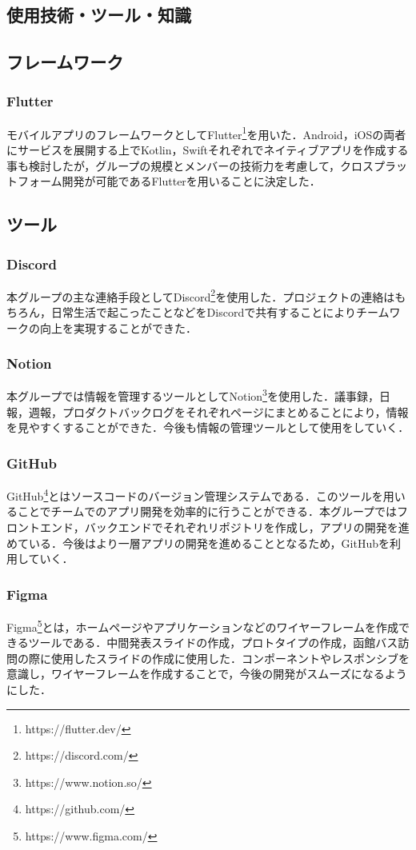 \documentclass[openany,11pt,papersize,dvipdfm]{jsbook}
\begin{document}
\begin{appendix}

\chapter{使用技術・ツール・知識}
\section{フレームワーク}
\subsection{Flutter}
モバイルアプリのフレームワークとしてFlutter\footnote{https://flutter.dev/}を用いた．Android，iOSの両者にサービスを展開する上でKotlin，Swiftそれぞれでネイティブアプリを作成する事も検討したが，グループの規模とメンバーの技術力を考慮して，クロスプラットフォーム開発が可能であるFlutterを用いることに決定した．

\section{ツール}
\subsection{Discord}
本グループの主な連絡手段としてDiscord\footnote{https://discord.com/}を使用した．プロジェクトの連絡はもちろん，日常生活で起こったことなどをDiscordで共有することによりチームワークの向上を実現することができた．

\subsection{Notion}
本グループでは情報を管理するツールとしてNotion\footnote{https://www.notion.so/}を使用した．議事録，日報，週報，プロダクトバックログをそれぞれページにまとめることにより，情報を見やすくすることができた．今後も情報の管理ツールとして使用をしていく．

\subsection{GitHub}
GitHub\footnote{https://github.com/}とはソースコードのバージョン管理システムである．このツールを用いることでチームでのアプリ開発を効率的に行うことができる．本グループではフロントエンド，バックエンドでそれぞれリポジトリを作成し，アプリの開発を進めている．今後はより一層アプリの開発を進めることとなるため，GitHubを利用していく．
\pagebreak
\subsection{Figma}
Figma\footnote{https://www.figma.com/}とは，ホームページやアプリケーションなどのワイヤーフレームを作成できるツールである．中間発表スライドの作成，プロトタイプの作成，函館バス訪問の際に使用したスライドの作成に使用した．コンポーネントやレスポンシブを意識し，ワイヤーフレームを作成することで，今後の開発がスムーズになるようにした．


\end{appendix}
\end{document}
